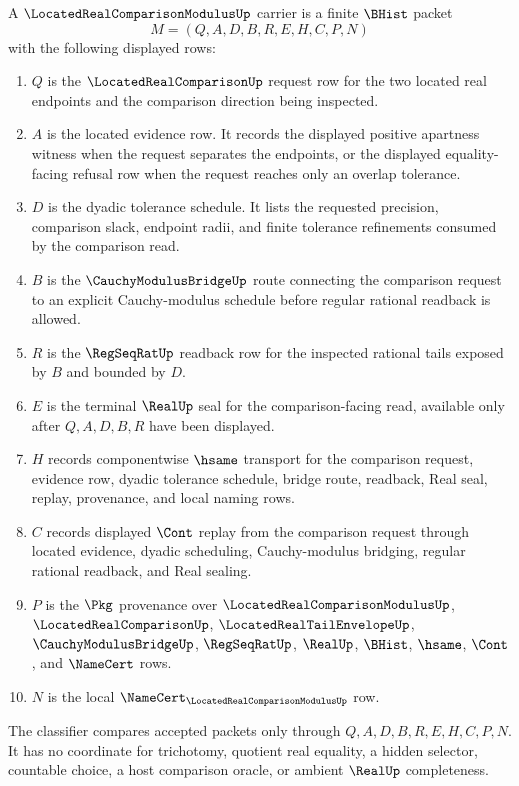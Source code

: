\begin{definition}
\label{def:located-real-comparison-modulus-carrier}
A $\LocatedRealComparisonModulusUp$ carrier is a finite $\BHist$ packet
$$
M=(Q,A,D,B,R,E,H,C,P,N)
$$
with the following displayed rows:
\begin{enumerate}
\item $Q$ is the $\LocatedRealComparisonUp$ request row for the two located real endpoints and the comparison direction being inspected.
\item $A$ is the located evidence row. It records the displayed positive apartness witness when the request separates the endpoints, or the displayed equality-facing refusal row when the request reaches only an overlap tolerance.
\item $D$ is the dyadic tolerance schedule. It lists the requested precision, comparison slack, endpoint radii, and finite tolerance refinements consumed by the comparison read.
\item $B$ is the $\CauchyModulusBridgeUp$ route connecting the comparison request to an explicit Cauchy-modulus schedule before regular rational readback is allowed.
\item $R$ is the $\RegSeqRatUp$ readback row for the inspected rational tails exposed by $B$ and bounded by $D$.
\item $E$ is the terminal $\RealUp$ seal for the comparison-facing read, available only after $Q,A,D,B,R$ have been displayed.
\item $H$ records componentwise $\hsame$ transport for the comparison request, evidence row, dyadic tolerance schedule, bridge route, readback, Real seal, replay, provenance, and local naming rows.
\item $C$ records displayed $\Cont$ replay from the comparison request through located evidence, dyadic scheduling, Cauchy-modulus bridging, regular rational readback, and Real sealing.
\item $P$ is the $\Pkg$ provenance over $\LocatedRealComparisonModulusUp$, $\LocatedRealComparisonUp$, $\LocatedRealTailEnvelopeUp$, $\CauchyModulusBridgeUp$, $\RegSeqRatUp$, $\RealUp$, $\BHist$, $\hsame$, $\Cont$, and $\NameCert$ rows.
\item $N$ is the local $\NameCert_{\LocatedRealComparisonModulusUp}$ row.
\end{enumerate}
The classifier compares accepted packets only through $Q,A,D,B,R,E,H,C,P,N$. It has no coordinate for trichotomy, quotient real equality, a hidden selector, countable choice, a host comparison oracle, or ambient $\RealUp$ completeness.
\end{definition}

